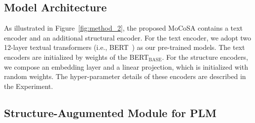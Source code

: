 \documentclass[11pt]{article}
\begin{document}
\subsection{Model Architecture}

As illustrated in Figure~\ref{fig:method_2}, the proposed MoCoSA contains a text encoder and an additional structural encoder. For the text encoder, we adopt two 12-layer textual transformers (i.e., BERT~\cite{devlin-etal-2019-bert}) as our pre-trained models. 
The text encoders are initialized by weights of the BERT$_{\text{BASE}}$. For the structure encoders, we compose an embedding layer and a linear projection, which is initialized with random weights. The hyper-parameter details of these encoders are described in the Experiment.

\subsection{Structure-Augumented Module for PLM}
\end{document}
